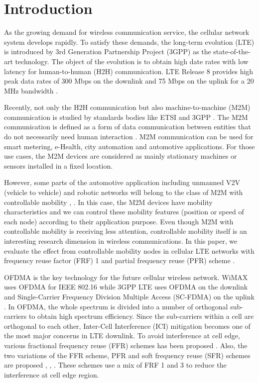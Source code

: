 \documentclass[conference]{IEEEtran}
\begin{document}
\IEEEpeerreviewmaketitle



\section{Introduction}

As the growing demand for wireless communication service, the cellular network system develops rapidly. To satisfy these demands, the long-term evolution (LTE) is introduced by 3rd Generation Partnership Project (3GPP) as the state-of-the-art technology. The object of the evolution is to obtain high date rates with low latency for human-to-human (H2H) communication. LTE Release 8 provides high peak data rates of 300 Mbps on the downlink and 75 Mbps on the uplink for a 20 MHz bandwidth \cite{Ghosh}.

Recently, not only the H2H communication but also machine-to-machine (M2M) communication is studied by standards bodies like ETSI \cite{ETSI} and 3GPP \cite{3GPP_b,3GPP_c}. The M2M communication is defined as a form of data communication between entities that do not necessarily need human interaction \cite{3GPP}. M2M communication can be used for smart metering, e-Health, city automation and automotive applications. For those use cases, the M2M devices are considered as mainly stationary machines or sensors installed in a fixed location.


However, some parts of the automotive application including unmanned V2V (vehicle to vehicle) and robotic networks will belong to the class of M2M with controllable mobility \cite{robot}, \cite{robo}. In this case, the M2M devices have mobility characteristics and we can control these mobility features (position or speed of each node) according to their application purpose. Even though M2M with controllable mobility is receiving less attention, controllable mobility itself is an interesting research dimension in wireless communications. In this paper, we evaluate the effect from controllable mobility nodes in cellular LTE networks with frequency reuse factor (FRF) 1 and partial frequency reuse (PFR) scheme \cite{Najjar}.


 OFDMA is the key technology for the future cellular wireless network. WiMAX uses OFDMA for IEEE 802.16 \cite{IEEE} while 3GPP LTE uses OFDMA on the downlink and Single-Carrier Frequency Division Multiple Access (SC-FDMA) on the uplink \cite{Ghosh}. In OFDMA, the whole spectrum is divided into a number of orthogonal sub-carriers to obtain high spectrum efficiency. Since the sub-carriers within a cell are orthogonal to each other, Inter-Cell Interference (ICI) mitigation becomes one of the most major concerns in LTE downlink. To avoid interference at cell edge, various fractional frequency reuse (FFR) schemes has been proposed \cite{Rahman}. Also, the two variations of the FFR scheme, PFR and soft frequency reuse (SFR) schemes are proposed \cite{Najjar}, \cite{Lei}, \cite {Huawei}. These schemes use a mix of FRF 1 and 3 to reduce the interference at cell edge region.
\end{document}
